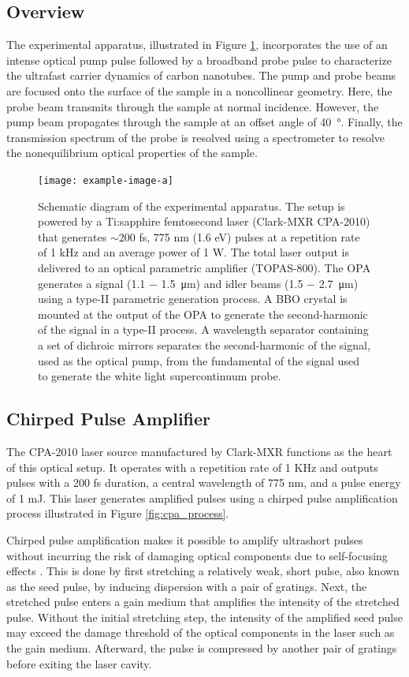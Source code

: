 \subsection{Overview}
The experimental apparatus, illustrated in Figure \ref{fig:setup_schematic}, incorporates the use of an intense optical pump pulse followed by a broadband probe pulse to characterize the ultrafast carrier dynamics of carbon nanotubes. The pump and probe beams are focused onto the surface of the sample in a noncollinear geometry. Here, the probe beam transmits through the sample at normal incidence. However, the pump beam propagates through the sample at an offset angle of \SI{40}{\degree}. Finally, the transmission spectrum of the probe is resolved using a spectrometer to resolve the nonequilibrium optical properties of the sample.


\begin{figure}[ht]
	\centering
	\texttt{[image: example-image-a]}
	\caption{Schematic diagram of the experimental apparatus. The setup is powered by a Ti:sapphire femtosecond laser (Clark-MXR CPA-2010) that generates $\sim$200 fs, 775 nm (1.6 eV) pulses at a repetition rate of 1 kHz and an average power of 1 W. The total laser output is delivered to an optical parametric amplifier (TOPAS-800). The OPA generates a signal (1.1 $-$ \SI{1.5}{\micro\meter}) and idler beams (1.5 $-$ \SI{2.7}{\micro\meter}) using a type-II parametric generation process.  A BBO crystal is mounted at the output of the OPA to generate the second-harmonic of the signal in a type-II process. A wavelength separator containing a set of dichroic mirrors separates the second-harmonic of the signal, used as the optical pump, from the fundamental of the signal used to generate the white light supercontinuum probe.}
	\label{fig:setup_schematic}
\end{figure}


\subsection{Chirped Pulse Amplifier}
The CPA-2010 laser source manufactured by Clark-MXR functions as the heart of this optical setup. It operates with a repetition rate of 1 KHz and outputs pulses with a 200 fs duration, a central wavelength of 775 nm, and a pulse energy of 1 mJ. This laser generates amplified pulses using a chirped pulse amplification process illustrated in Figure \ref{fig:cpa_process}.

Chirped pulse amplification makes it possible to amplify ultrashort pulses without incurring the risk of damaging optical components due to self-focusing effects \cite{strickland1985compression}. This is done by first stretching a relatively weak, short pulse, also known as the seed pulse, by inducing dispersion with a pair of gratings. Next, the stretched pulse enters a gain medium that amplifies the intensity of the stretched pulse. Without the initial stretching step, the intensity of the amplified seed pulse may exceed the damage threshold of the optical components in the laser such as the gain medium. Afterward, the pulse is compressed by another pair of gratings before exiting the laser cavity.

